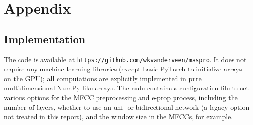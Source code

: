 \chapter{Appendix}\label{ch:appendix}

\section{Implementation}
The code is available at \texttt{https://github.com/wkvanderveen/maspro}.
It does not require any machine learning libraries (except basic PyTorch to initialize arrays on the GPU); all computations are explicitly implemented in pure multidimensional NumPy-like arrays.
The code contains a configuration file to set various options for the MFCC preprocessing and e-prop process, including the number of layers, whether to use an uni- or bidirectional network (a legacy option not treated in this report), and the window size in the MFCCs, for example.

